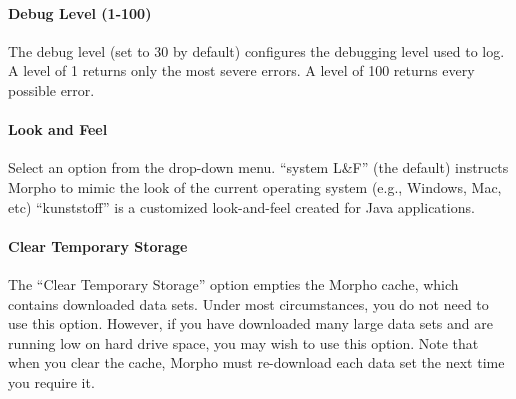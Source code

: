 \paragraph{Debug Level (1-100)} The debug level (set to 30 by default)
configures the debugging level used to log. A level of 1 returns only
the most severe errors. A level of 100 returns every possible error.

\paragraph{Look and Feel} Select an option from the drop-down menu.
``system L\&F'' (the default) instructs Morpho to mimic the look of the
current operating system (e.g., Windows, Mac, etc) ``kunststoff'' is a
customized look-and-feel created for Java applications.

\paragraph{Clear Temporary Storage} The ``Clear Temporary Storage''
option empties the Morpho cache, which contains downloaded data sets.
Under most circumstances, you do not need to use this option. However,
if you have downloaded many large data sets and are running low on hard
drive space, you may wish to use this option. Note that when you clear
the cache, Morpho must re-download each data set the next time you
require it.
